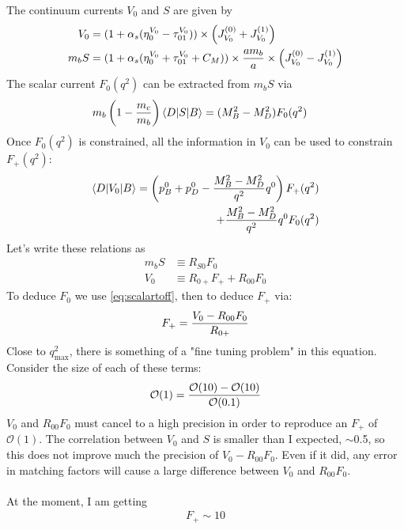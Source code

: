 The continuum currents $V_0$ and $S$ are given by
\begin{align}
        V_0 &= (1 + \alpha_s (\eta_{0}^{V_0} - \tau_{01}^{V_0})) \times \left( J_{V_0}^{(0)} + J_{V_0}^{(1)} \right) \\  
        m_b S &= (1 + \alpha_s (\eta_{0}^{V_0} + \tau_{01}^{V_0} + C_M))\times {am_b\over a} \times \left( J_{V_0}^{(0)} - J_{V_0}^{(1)} \right)
\end{align}
The scalar current $F_0(q^2)$ can be extracted from $m_b S$ via
\begin{align}
        m_b \left(1 - {m_c\over m_b} \right) \langle D | S | B \rangle &= ( M_B^2 - M_D^2 ) F_0(q^2)
\end{align}
Once $F_0(q^2)$ is constrained, all the information in $V_0$ can be used to constrain $F_+(q^2)$:
\begin{align}
        \langle D | V_0 | B \rangle = \left( p_B^0 + p_D^0 - {{M_B^2-M_D^2}\over q^2} q^0 \right) F_+(q^2) \\
                + {{M_B^2-M_D^2}\over q^2} q^0 F_0(q^2)
                \nonumber
\end{align}
Let's write these relations as
\begin{align}
        \label{eq:scalartoff}
        m_b S & \equiv R_{S0} F_0 \\
        V_0 & \equiv R_{0+} F_+ + R_{00} F_0
\end{align}
To deduce $F_0$ we use \eqref{eq:scalartoff}, then to deduce $F_+$ via:
\begin{align}
        F_+ = {V_0 - R_{00} F_0 \over R_{0+}}
\end{align}
Close to $q^2_{\text{max}}$, there is something of a "fine tuning problem" in this equation. Consider the size of each of these terms:
\begin{align}
        \mathcal{O}(1) = {\mathcal{O}(10) - \mathcal{O}(10) \over \mathcal{O}(0.1)}
\end{align}
$V_0$ and $R_{00}F_0$ must cancel to a high precision in order to reproduce an $F_+$ of $\mathcal{O}(1)$.  The correlation between $V_0$ and $S$ is smaller than I expected, $\sim$0.5, so this does not improve much the precision of $V_0-R_{00}F_0$. Even if it did, any error in matching factors will cause a large difference between $V_0$ and $R_{00} F_0$.
\\ \\
At the moment, I am getting
\begin{align}
        F_+ \sim 10
\end{align}
